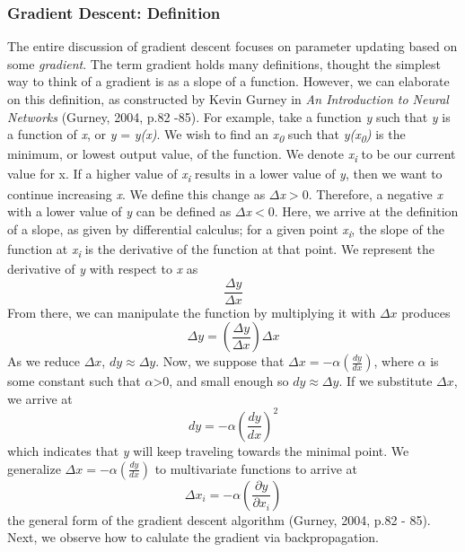 \documentclass[11pt]{article}
\begin{document}
\subsubsection{Gradient Descent: Definition}
The entire discussion of gradient descent focuses on parameter updating based on some \textit{gradient}. The term gradient holds many definitions, thought the simplest way to think of a gradient is as a slope of a function. However, we can elaborate on this definition, as constructed by Kevin Gurney in \textit{An Introduction to Neural Networks} (Gurney, 2004, p.82 -85). For example, take a function \textit{y} such that \textit{y} is a function of \textit{x}, or \textit{y} = \textit{y(x)}. We wish to find an \textit{x\textsubscript{0}} such that \textit{y(x\textsubscript{0})} is the minimum, or lowest output value, of the function. We denote \textit{x\textsubscript{i}} to be our current value for x. If a higher value of \textit{x\textsubscript{i}} results in a lower value of \textit{y}, then we want to continue increasing \textit{x}. We define this change as $\Delta$\textit{x}$>$0. Therefore, a negative \textit{x} with a lower value of \textit{y} can be defined as $\Delta$\textit{x}$<$0. Here, we arrive at the definition of a slope, as given by differential calculus; for a given point \textit{x\textsubscript{i}}, the slope of the function at \textit{x\textsubscript{i}} is the derivative of the function at that point. We represent the derivative of \textit{y} with respect to \textit{x} as $$\frac{\Delta y}{\Delta x}$$ From there, we can manipulate the function by multiplying it with $\Delta x$ produces $$\Delta y = (\frac{\Delta y}{\Delta x})\Delta x$$ As we reduce $\Delta x$, $dy \approx \Delta y$. Now, we suppose that $\Delta x = -\alpha(\frac{dy}{dx}) $, where $\alpha$ is some constant such that $\alpha$>0, and small enough so $dy \approx \Delta y$. If we substitute $\Delta x$, we arrive at $$ dy = -\alpha(\frac{dy}{dx})^{2}$$ which indicates that \textit{y} will keep traveling towards the minimal point. We generalize $\Delta x = -\alpha(\frac{dy}{dx}) $ to multivariate functions to arrive at $$\Delta x_i = -\alpha(\frac{\partial y}{\partial x_i})$$ the general form of the gradient descent algorithm (Gurney, 2004, p.82 - 85). Next, we observe how to calulate the gradient via backpropagation.
\end{document}
